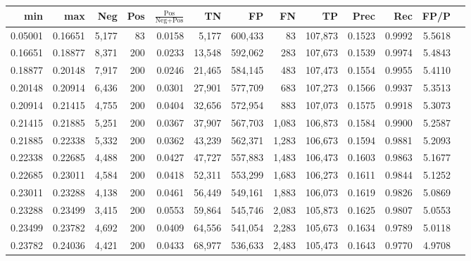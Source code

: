 \begin{tabular}{rrrrrrrrrrrrr}
\toprule
    min &     max &   Neg & Pos & $\frac{\text{Pos}}{\text{Neg}+\text{Pos}}$ &      TN &      FP &      FN &      TP &   Prec &    Rec &   FP/P \\
\midrule
0.05001 & 0.16651 & 5,177 &  83 &                                     0.0158 &   5,177 & 600,433 &      83 & 107,873 & 0.1523 & 0.9992 & 5.5618 \\
0.16651 & 0.18877 & 8,371 & 200 &                                     0.0233 &  13,548 & 592,062 &     283 & 107,673 & 0.1539 & 0.9974 & 5.4843 \\
0.18877 & 0.20148 & 7,917 & 200 &                                     0.0246 &  21,465 & 584,145 &     483 & 107,473 & 0.1554 & 0.9955 & 5.4110 \\
0.20148 & 0.20914 & 6,436 & 200 &                                     0.0301 &  27,901 & 577,709 &     683 & 107,273 & 0.1566 & 0.9937 & 5.3513 \\
0.20914 & 0.21415 & 4,755 & 200 &                                     0.0404 &  32,656 & 572,954 &     883 & 107,073 & 0.1575 & 0.9918 & 5.3073 \\
0.21415 & 0.21885 & 5,251 & 200 &                                     0.0367 &  37,907 & 567,703 &   1,083 & 106,873 & 0.1584 & 0.9900 & 5.2587 \\
0.21885 & 0.22338 & 5,332 & 200 &                                     0.0362 &  43,239 & 562,371 &   1,283 & 106,673 & 0.1594 & 0.9881 & 5.2093 \\
0.22338 & 0.22685 & 4,488 & 200 &                                     0.0427 &  47,727 & 557,883 &   1,483 & 106,473 & 0.1603 & 0.9863 & 5.1677 \\
0.22685 & 0.23011 & 4,584 & 200 &                                     0.0418 &  52,311 & 553,299 &   1,683 & 106,273 & 0.1611 & 0.9844 & 5.1252 \\
0.23011 & 0.23288 & 4,138 & 200 &                                     0.0461 &  56,449 & 549,161 &   1,883 & 106,073 & 0.1619 & 0.9826 & 5.0869 \\
0.23288 & 0.23499 & 3,415 & 200 &                                     0.0553 &  59,864 & 545,746 &   2,083 & 105,873 & 0.1625 & 0.9807 & 5.0553 \\
0.23499 & 0.23782 & 4,692 & 200 &                                     0.0409 &  64,556 & 541,054 &   2,283 & 105,673 & 0.1634 & 0.9789 & 5.0118 \\
0.23782 & 0.24036 & 4,421 & 200 &                                     0.0433 &  68,977 & 536,633 &   2,483 & 105,473 & 0.1643 & 0.9770 & 4.9708 \\

\end{tabular}
